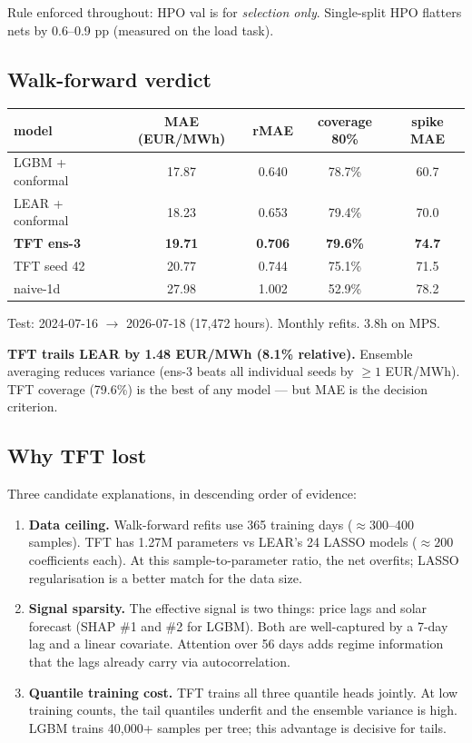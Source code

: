 Rule enforced throughout: HPO val is for \emph{selection only}.
Single-split HPO flatters nets by 0.6--0.9 pp (measured on the load task).

\subsection{Walk-forward verdict}

\begin{center}
\begin{tabular}{lcccc}
\toprule
model & MAE (EUR/MWh) & rMAE & coverage 80\% & spike MAE \\
\midrule
LGBM + conformal & 17.87 & 0.640 & 78.7\% & 60.7 \\
LEAR + conformal & 18.23 & 0.653 & 79.4\% & 70.0 \\
\textbf{TFT ens-3} & \textbf{19.71} & \textbf{0.706} & \textbf{79.6\%} & \textbf{74.7} \\
TFT seed 42 & 20.77 & 0.744 & 75.1\% & 71.5 \\
naive-1d & 27.98 & 1.002 & 52.9\% & 78.2 \\
\bottomrule
\end{tabular}
\end{center}

Test: 2024-07-16 $\to$ 2026-07-18 (17,472 hours). Monthly refits. 3.8h on MPS.

\textbf{TFT trails LEAR by 1.48 EUR/MWh (8.1\% relative).}
Ensemble averaging reduces variance (ens-3 beats all individual seeds by $\geq 1$ EUR/MWh).
TFT coverage (79.6\%) is the best of any model --- but MAE is the decision criterion.

\subsection{Why TFT lost}

Three candidate explanations, in descending order of evidence:

\begin{enumerate}
  \item \textbf{Data ceiling.} Walk-forward refits use 365 training days
        ($\approx 300$--400 samples). TFT has 1.27M parameters vs LEAR's 24 LASSO
        models ($\approx 200$ coefficients each). At this sample-to-parameter ratio,
        the net overfits; LASSO regularisation is a better match for the data size.
  \item \textbf{Signal sparsity.} The effective signal is two things: price lags
        and solar forecast (SHAP \#1 and \#2 for LGBM). Both are well-captured by
        a 7-day lag and a linear covariate. Attention over 56 days adds regime
        information that the lags already carry via autocorrelation.
  \item \textbf{Quantile training cost.} TFT trains all three quantile heads jointly.
        At low training counts, the tail quantiles underfit and the ensemble variance
        is high. LGBM trains 40,000+ samples per tree; this advantage is decisive
        for tails.
\end{enumerate}

